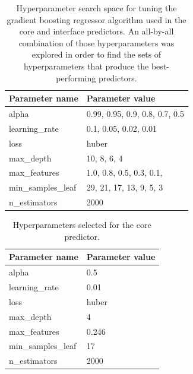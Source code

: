 \begin{table}[tb]
    \captionsetup{width=0.6\textwidth}
	\centering
	\caption[Hyperparameter search space.]{
        Hyperparameter search space for tuning the gradient boosting regressor algorithm used in the core and interface predictors.
		An all-by-all combination of those hyperparameters was explored in order to find the sets of hyperparameters that produce the best-performing predictors.
    }
	\label{tab:gridsearch_parameters}
	\begin{tabular}{ l | l }
		\toprule
		Parameter name     & Parameter value                \\
		\midrule
		alpha              & 0.99, 0.95, 0.9, 0.8, 0.7, 0.5 \\
		learning\_rate     & 0.1, 0.05, 0.02, 0.01          \\
		loss               & huber                          \\
		max\_depth         & 10, 8, 6, 4                    \\
		max\_features      & 1.0, 0.8, 0.5, 0.3, 0.1,       \\
		min\_samples\_leaf & 29, 21, 17, 13, 9, 5, 3        \\
		n\_estimators      & 2000                           \\
		\bottomrule
	\end{tabular}
\end{table}

\begin{table}[tb]
	\centering
	\caption[Hyperparameters selected for the core predictor.]{
            Hyperparameters selected for the core predictor.
        }
    \label{tab:core_hyperparameters}
	\begin{tabular}{ l | l }
		\toprule
		Parameter name     & Parameter value \\
		\midrule
		alpha              & 0.5             \\
		learning\_rate     & 0.01            \\
		loss               & huber           \\
		max\_depth         & 4               \\
		max\_features      & 0.246           \\
		min\_samples\_leaf & 17              \\
		n\_estimators      & 2000            \\
		\bottomrule
	\end{tabular}
\end{table}

